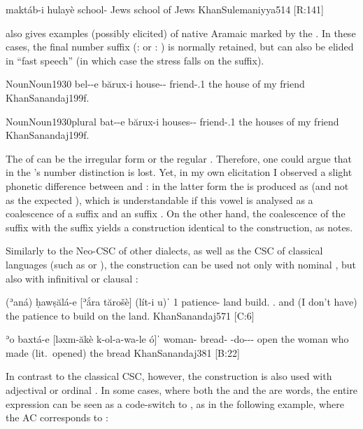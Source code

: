 {maktáb-i hulayè}
{school-\ez{} Jews}
{school of Jews}
{KhanSulemaniyya}{514 {[R:141]}}

\citet[199]{KhanSanandaj} also gives  examples (possibly elicited) of native Aramaic \prims marked by the \ez*. In these cases, the final number suffix (\sg:  or \pl:   ) is normally retained, but can also be elided in \enquote{fast speech} (in which case the stress falls on the \ez* suffix).

\acex
{Noun}{Noun}{1930}
{bel--e bărux-i}
{house-\opt\sg-\ez{} friend-\poss.1\sg}
{the house of my friend}
{KhanSanandaj}{199f.}\antipar
\newpage

\acex
{Noun}{Noun}{1930plural}
{bat--e bărux-i}
{houses-\opt\pl-\ez{} friend-\poss.1\sg}
{the houses of my friend}
{KhanSanandaj}{199f.}\antipar


The \pl* of  can be the irregular form  or the regular . Therefore, one could argue that in  the \prim's number distinction is lost. Yet, in my own elicitation I observed a slight phonetic difference between  and : in the latter form the \ez* is produced as \phonetic[æ] (and not as the expected \phonetic[e]), which is understandable if this vowel is analysed as a coalescence of a \sg* suffix  and an \ez* suffix . On the other hand, the coalescence of the \ez* suffix with the \pl* suffix yields a construction identical to the  construction, as \citet[200]{KhanSanandaj} notes.


Similarly to the Neo-CSC of other  dialects, as well as the  CSC of classical  languages (such as \BHeb or \Akk), the \ez* construction can be used not only with nominal \secns, but also with   infinitival or clausal \secns:

{(ʾaná) ḥawṣălá-e [ʾắra tărošè] (lít-i \cb{}u)ˈ}
{1\sg{} patience-\ez{} land build.\inf{} \neg.\sg{} \cb{}and}
{(I don't have) the patience to build on the land.}
{KhanSanandaj}{571 {[C:6]}}

{ʾo\cb{} baxtá-e [ləxm-ăkè k-ol-a-wa-le \cb{}ó]ˈ}
{\cb{} woman-\ez{} bread- \ind-do-\fem-\pst-\masc{} \cb{}open}
{the woman who made (lit.\ opened) the bread}
{KhanSanandaj}{381 {[B:22]}}

In contrast to the classical  CSC, however, the \ez* construction is also used with adjectival or ordinal \secns. In some cases, where both the \prim and the \secn are \Per words, the entire expression can be seen as a code-switch to \Per, as in the following example, where the AC corresponds to \Per {}: 

